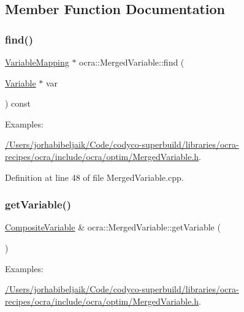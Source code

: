 \subsection{Member Function Documentation}
\hypertarget{classocra_1_1MergedVariable_a54dea5dde63addca4de73ea8fdb6073b}{}\label{classocra_1_1MergedVariable_a54dea5dde63addca4de73ea8fdb6073b} 
\subsubsection{\texorpdfstring{find()}{find()}}
{\footnotesize\ttfamily \hyperlink{classocra_1_1VariableMapping}{Variable\+Mapping} $\ast$ ocra\+::\+Merged\+Variable\+::find (\begin{DoxyParamCaption}\item[{\hyperlink{classocra_1_1Variable}{Variable} $\ast$}]{var }\end{DoxyParamCaption}) const}

\begin{Desc}
\item[Examples\+: ]\par
\hyperlink{_2Users_2jorhabibeljaik_2Code_2codyco-superbuild_2libraries_2ocra-recipes_2ocra_2include_2ocra_27dfe52ed2d2fe1904154f5be9150e8b1}{/\+Users/jorhabibeljaik/\+Code/codyco-\/superbuild/libraries/ocra-\/recipes/ocra/include/ocra/optim/\+Merged\+Variable.\+h}.\end{Desc}


Definition at line 48 of file Merged\+Variable.\+cpp.

\hypertarget{classocra_1_1MergedVariable_afa4986407c3fbaebe268fd248b2c4bcf}{}\label{classocra_1_1MergedVariable_afa4986407c3fbaebe268fd248b2c4bcf} 
\subsubsection{\texorpdfstring{get\+Variable()}{getVariable()}}
{\footnotesize\ttfamily \hyperlink{classocra_1_1CompositeVariable}{Composite\+Variable} \& ocra\+::\+Merged\+Variable\+::get\+Variable (\begin{DoxyParamCaption}{ }\end{DoxyParamCaption})}

\begin{Desc}
\item[Examples\+: ]\par
\hyperlink{_2Users_2jorhabibeljaik_2Code_2codyco-superbuild_2libraries_2ocra-recipes_2ocra_2include_2ocra_27dfe52ed2d2fe1904154f5be9150e8b1}{/\+Users/jorhabibeljaik/\+Code/codyco-\/superbuild/libraries/ocra-\/recipes/ocra/include/ocra/optim/\+Merged\+Variable.\+h}.\end{Desc}


